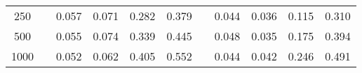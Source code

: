% 
\begin{tabular}{ccccccccccc}
  \hline
  \hline
250 &  & 0.057 & 0.071 & 0.282 & 0.379 &  & 0.044 & 0.036 & 0.115 & 0.310 \\ 
  500 &  & 0.055 & 0.074 & 0.339 & 0.445 &  & 0.048 & 0.035 & 0.175 & 0.394 \\ 
  1000 &  & 0.052 & 0.062 & 0.405 & 0.552 &  & 0.044 & 0.042 & 0.246 & 0.491 \\ 
   \hline
\end{tabular}
